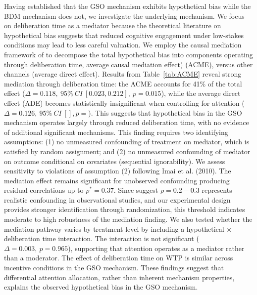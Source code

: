 \documentclass[12pt]{article}
\begin{document}
Having established that the GSO mechanism exhibits hypothetical bias while the BDM mechanism does not, we investigate the underlying mechanism. We focus on deliberation time as a mediator because the theoretical literature on hypothetical bias suggests that reduced cognitive engagement under low-stakes conditions may lead to less careful valuation\citep{sims2003implications}.
We employ the causal mediation framework of \citet{imai2010general} to decompose the total hypothetical bias into components operating through deliberation time, average causal mediation effect) (ACME), versus other channels (average direct effect). Results from Table~\ref{tab:ACME} reveal strong mediation through deliberation time: the ACME accounts for 41\% of the total effect (\(\Delta = 0.118,\ 95\%\ CI\ [0.023, 0.212],\ p = 0.015\)), while the average direct effect (ADE) becomes statistically insignificant when controlling for attention (\(\Delta = 0.126, \ 95\% \ CI \ [], p = \)). This suggests that hypothetical bias in the GSO mechanism operates largely through reduced deliberation time, with no evidence of additional significant mechanisms.
This finding requires two identifying assumptions: (1) no unmeasured confounding of treatment on mediator, which is satisfied by random assignment; and (2) no unmeasured confounding of mediator on outcome conditional on covariates (sequential ignorability). We assess sensitivity to violations of assumption (2) following Imai et al. (2010). The mediation effect remains significant for unobserved confounding producing residual correlations up to $\rho^* = 0.37$. Since \citet{imai2010general} suggest $\rho = 0.2-0.3$ represents realistic confounding in observational studies, and our experimental design provides stronger identification through randomization, this threshold indicates moderate to high robustness of the mediation finding.
We also tested whether the mediation pathway varies by treatment level by including a hypothetical × deliberation time interaction. The interaction is not significant (\(\Delta = 0.003,\ p = 0.965\)), supporting that attention operates as a mediator rather than a moderator. The effect of deliberation time on WTP is similar across incentive conditions in the GSO mechanism.
These findings suggest that differential attention allocation, rather than inherent mechanism properties, explains the observed hypothetical bias in the GSO mechanism. 
\end{document}
